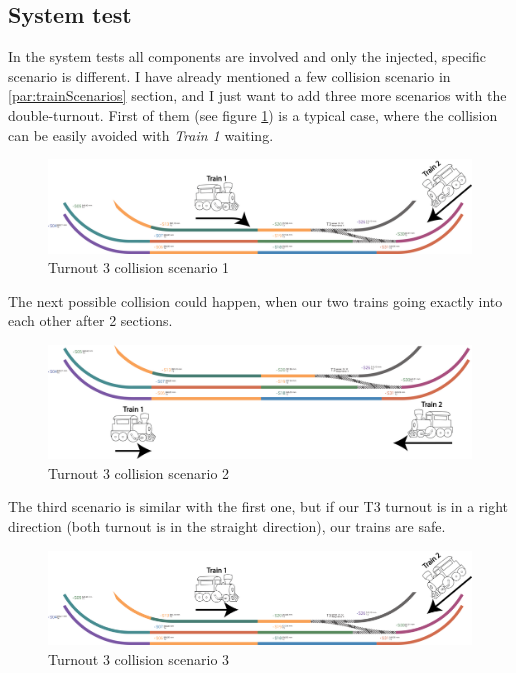 



\subsection{System test}
In the system tests all components are involved and only the injected, specific scenario is different. 
I have already mentioned a few collision scenario in \ref{par:trainScenarios} section, and I just want to add three more scenarios with the double-turnout. First of them (see figure \ref{fig:LayoutT3-scenario1}) is a typical case, where the collision can be easily avoided with \textit{Train 1} waiting.
\begin{figure}[!h]
	\centering
	\includegraphics[width=150mm, keepaspectratio]{figures/modes3/layoutT3-scenario1.png}
	\caption{Turnout 3 collision scenario 1}
	\label{fig:LayoutT3-scenario1}
\end{figure}

The next possible collision could happen, when our two trains going exactly into each other after 2 sections.
\begin{figure}[!h]
	\centering
	\includegraphics[width=150mm, keepaspectratio]{figures/modes3/layoutT3-scenario2.png}
	\caption{Turnout 3 collision scenario 2}
	\label{fig:LayoutT3-scenario2}
\end{figure}

The third scenario is similar with the first one, but if our T3 turnout is in a right direction (both turnout is in the straight direction), our trains are safe.
\begin{figure}[!h]
	\centering
	\includegraphics[width=150mm, keepaspectratio]{figures/modes3/layoutT3-scenario3.png}
	\caption{Turnout 3 collision scenario 3}
	\label{fig:LayoutT3-scenario3}
\end{figure}